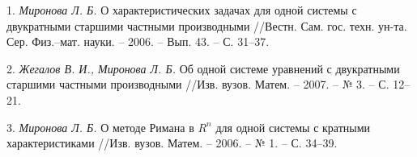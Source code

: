 


1. {\it Миронова Л. Б.} О характеристических задачах для одной системы с двукратными старшими частными производными //Вестн. Сам. гос. техн. ун-та. Сер. Физ.--мат. науки. -- 2006. -- Вып. 43. -- С. 31--37.

2. {\it Жегалов В. И., Миронова Л. Б.} Об одной системе уравнений с двукратными старшими частными производными //Изв. вузов. Матем.
-- 2007. -- № 3. -- С. 12--21.

3. {\it Миронова Л. Б.} О методе Римана в $R^n$ для одной системы с кратными характеристиками //Изв. вузов. Матем. -- 2006. -- 
№ 1. -- С. 34--39.



